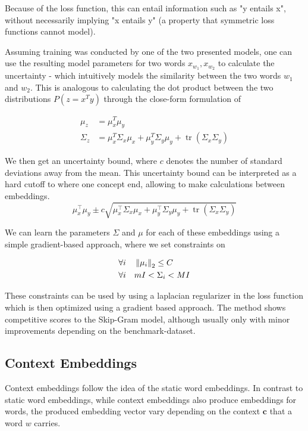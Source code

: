\documentclass[a4paper,12pt,twoside,openright]{report}
\begin{document}
Because of the loss function, this can entail information such as "y entails x", without necessarily implying "x entails y" (a property that symmetric loss functions cannot model).

Assuming training was conducted by one of the two presented models,  one can use the resulting model parameters for two words $x_{w_1}, x_{w_2}$ to calculate the uncertainty - which intuitively models the similarity between the two words $w_1$ and $w_2$.
This is analogous to calculating the dot product between the two distributions $P(z=x^T y)$ through the close-form formulation of

\begin{align}
\mu_z &= \mu_x^T \mu_y \\
\Sigma_z &= \mu_{x}^T \Sigma_{x} \mu_{x}+\mu_{y}^T \Sigma_{y} \mu_{y}+\operatorname{tr}\left(\Sigma_{x} \Sigma_{y}\right)
\end{align}

We then get an uncertainty bound, where $c$ denotes the number of standard deviations away from the mean.
This uncertainty bound can be interpreted as a hard cutoff to where one concept end, allowing to make calculations between embeddings.
\begin{equation}
\mu_{x}^{\top} \mu_{y} \pm c \sqrt{\mu_{x}^{\top} \Sigma_{x} \mu_{x}+\mu_{y}^{\top} \Sigma_{y} \mu_{y}+\operatorname{tr}\left(\Sigma_{x} \Sigma_{y}\right)}
\end{equation}

We can learn the parameters $\Sigma$ and $\mu$ for each of these embeddings using a simple gradient-based approach, where we set constraints on 

\begin{align}
\forall i \quad & \left\lVert \mu_i \right\rVert_2  \leq C\\
\forall i \quad & m I <  \Sigma_i < M I
\end{align}

These constraints can be used by using a laplacian regularizer in the loss function which is then optimized using a gradient based approach. 
The method shows competitive scores to the Skip-Gram model, although usually only with minor improvements depending on the benchmark-dataset.

\newpage
\subsection{Context Embeddings}

Context embeddings follow the idea of the static word embeddings.
In contrast to static word embeddings, while context embeddings also produce embeddings for words, the produced embedding vector vary depending on the context $\mathbf{c}$ that a word $w$ carries.
\end{document}
